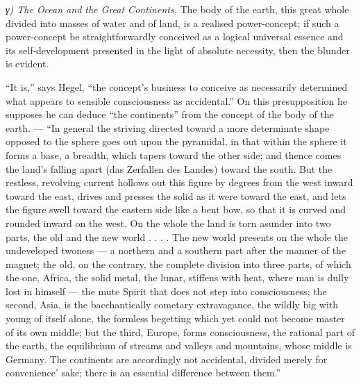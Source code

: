 \documentclass[12pt,a4paper]{book}
\newcommand{\subrunin}[1]{\emph{#1}\hspace{0.4em}}
\begin{document}
\subrunin{γ) The Ocean and the Great Continents.} The body of the earth, this great whole divided into masses of water
and of land, is a realised power-concept; if such a power-concept be straightforwardly conceived as a logical universal
essence and its self-development presented in the light of absolute necessity, then the blunder is evident.

``It is,'' says Hegel, ``the concept's business to conceive as necessarily determined what appears to sensible
consciousness as accidental.'' On this presupposition he supposes he can deduce ``the continents'' from the concept of
the body of the earth. --- ``In general the striving directed toward a more determinate shape opposed to the sphere goes
out upon the pyramidal, in that within the sphere it forms a base, a breadth, which tapers toward the other side; and
thence comes the land's falling apart (das Zerfallen des Landes) toward the south. But the restless, revolving current
hollows out this figure by degrees from the west inward toward the east, drives and presses the solid as it were toward
the east, and lets the figure swell toward the eastern side like a bent bow, so that it is curved and rounded inward on
the west. On the whole the land is torn asunder into two parts, the old and the new world . . . . The new world
presents on the whole the undeveloped twoness --- a northern and a southern part after the manner of the magnet; the old,
on the contrary, the complete division into three parts, of which the one, Africa, the solid metal, the lunar, stiffens
with heat, where man is dully lost in himself --- the mute Spirit that does not step into consciousness; the second,
Asia, is the bacchantically cometary extravagance, the wildly
big with young of itself alone, the formless begetting which yet could not become master of its own middle; but the
third, Europe, forms consciousness, the rational part of the earth, the equilibrium of streams and valleys and mountains,
whose middle is Germany. The continents are accordingly not accidental, divided merely for convenience' sake; there is an
essential difference between them.''
\end{document}
